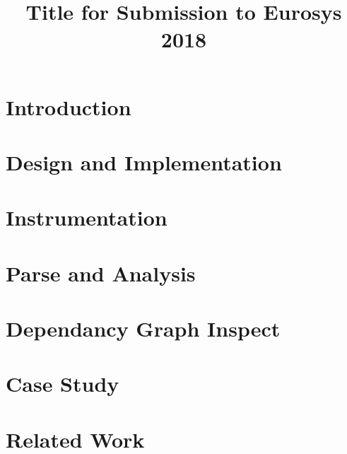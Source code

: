 \documentclass[10pt,preprint]{sigplanconf-eurosys}
\date{}
\begin{document}
\title{Title for Submission to Eurosys 2018} 
\maketitle

\begin{abstract}



\end{abstract}

\section{Introduction}



\section{Design and Implementation}



\section{Instrumentation}



\section{Parse and Analysis}


\section{Dependancy Graph Inspect}

\section{Case Study}

\section{Related Work}



% 
\end{document}
